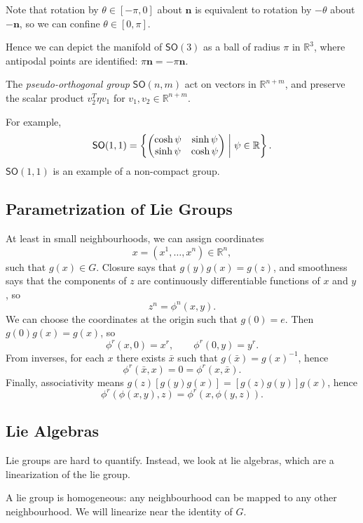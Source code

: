 \documentclass[12pt]{article}
\begin{document}
Note that rotation by $\theta \in [-\pi, 0]$ about $\mathbf{n}$ is equivalent to rotation by $-\theta$ about $- \mathbf{n}$, so we can confine $\theta \in [0, \pi]$.

Hence we can depict the manifold of $\mathsf{SO}(3)$ as a ball of radius $\pi$ in $\mathbb{R}^3$, where antipodal points are identified: $\pi \mathbf{n} = - \pi \mathbf{n}$.


The \emph{pseudo-orthogonal group} $\mathsf{SO}(n, m)$ act on vectors in $\mathbb{R}^{n + m}$, and preserve the scalar product $v_2^T \eta v_1$ for $v_1, v_2 \in \mathbb{R}^{n+m}$.

For example,
\[
\mathsf{SO}(1, 1) = \left\{
	\begin{pmatrix}
		\cosh \psi & \sinh \psi \\
		\sinh \psi & \cosh \psi
	\end{pmatrix}
\biggm| \psi \in \mathbb{R} \right\}.
\]
$\mathsf{SO}(1, 1)$ is an example of a non-compact group.

\subsection{Parametrization of Lie Groups}%
\label{sub:param_lie}

At least in small neighbourhoods, we can assign coordinates
\[
x = (x^1, \ldots, x^n) \in \mathbb{R}^n,
\]
such that $g(x) \in G$. Closure says that $g(y) g(x) = g(z)$, and smoothness says that the components of $z$ are continuously differentiable functions of $x$ and $y$, so
\[
z^n = \phi^n(x, y).
\]
We can choose the coordinates at the origin such that $g(0) = e$. Then $g(0) g(x) = g(x)$, so
\[
\phi^r(x, 0) = x^r, \qquad \phi^r(0, y) = y^r.
\]
From inverses, for each $x$ there exists $\bar x$ such that $g(\bar x) = g(x)^{-1}$, hence
\[
\phi^r(\bar x, x) = 0 = \phi^r(x, \bar x).
\]
Finally, associativity means $g(z)[g(y)g(x)] = [g(z)g(y)]g(x)$, hence
\[
\phi^r(\phi(x, y), z) = \phi^r(x, \phi(y, z)).
\]
\subsection{Lie Algebras}%
\label{sub:lie_a}

Lie groups are hard to quantify. Instead, we look at lie algebras, which are a linearization of the lie group.

A lie group is homogeneous: any neighbourhood can be mapped to any other neighbourhood. We will linearize near the identity of $G$.
\end{document}
